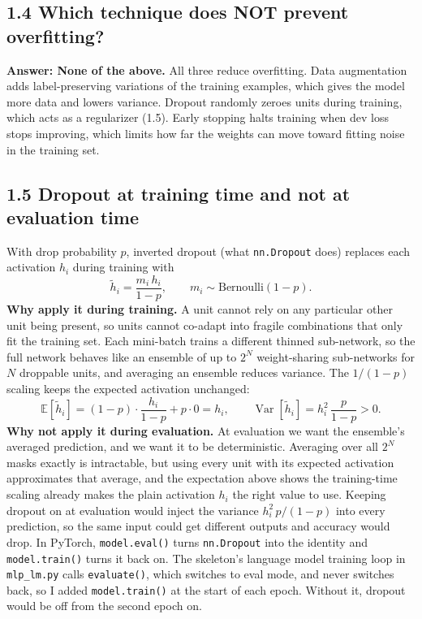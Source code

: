 \documentclass[11pt]{article}
\begin{document}
\subsection*{1.4 Which technique does NOT prevent overfitting?}
\textbf{Answer: None of the above.} All three reduce overfitting. Data augmentation adds label-preserving variations of the training examples, which gives the model more data and lowers variance. Dropout randomly zeroes units during training, which acts as a regularizer (1.5). Early stopping halts training when dev loss stops improving, which limits how far the weights can move toward fitting noise in the training set.

\subsection*{1.5 Dropout at training time and not at evaluation time}
With drop probability $p$, inverted dropout (what \texttt{nn.Dropout} does) replaces each activation $h_i$ during training with
\[
\tilde h_i = \frac{m_i\,h_i}{1-p}, \qquad m_i \sim \text{Bernoulli}(1-p).
\]
\textbf{Why apply it during training.} A unit cannot rely on any particular other unit being present, so units cannot co-adapt into fragile combinations that only fit the training set. Each mini-batch trains a different thinned sub-network, so the full network behaves like an ensemble of up to $2^N$ weight-sharing sub-networks for $N$ droppable units, and averaging an ensemble reduces variance. The $1/(1-p)$ scaling keeps the expected activation unchanged:
\[
\mathbb{E}[\tilde h_i] = (1-p)\cdot\frac{h_i}{1-p} + p\cdot 0 = h_i,
\qquad
\operatorname{Var}[\tilde h_i] = h_i^2\,\frac{p}{1-p} > 0 .
\]
\textbf{Why not apply it during evaluation.} At evaluation we want the ensemble's averaged prediction, and we want it to be deterministic. Averaging over all $2^N$ masks exactly is intractable, but using every unit with its expected activation approximates that average, and the expectation above shows the training-time scaling already makes the plain activation $h_i$ the right value to use. Keeping dropout on at evaluation would inject the variance $h_i^2\,p/(1-p)$ into every prediction, so the same input could get different outputs and accuracy would drop. In PyTorch, \texttt{model.eval()} turns \texttt{nn.Dropout} into the identity and \texttt{model.train()} turns it back on. The skeleton's language model training loop in \texttt{mlp\_lm.py} calls \texttt{evaluate()}, which switches to eval mode, and never switches back, so I added \texttt{model.train()} at the start of each epoch. Without it, dropout would be off from the second epoch on.
\end{document}
